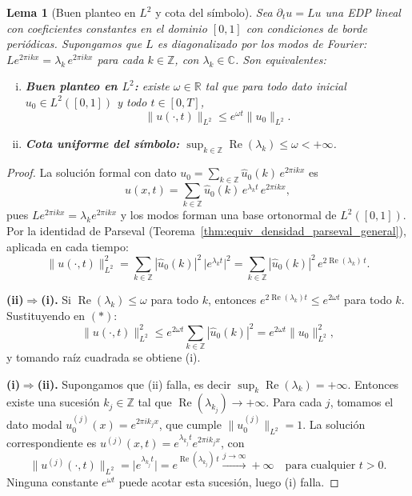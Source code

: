\documentclass[a4paper,11pt]{report}
\newtheorem{lemma}[theorem]{Lema}
\begin{document}
\begin{lemma}[Buen planteo en $L^2$ y cota del símbolo]\label{lem:buen_planteo_lambda}
Sea $\partial_t u = Lu$ una EDP lineal con coeficientes constantes en el dominio $[0,1]$ con condiciones de borde periódicas. Supongamos que $L$ es diagonalizado por los modos de Fourier: $L e^{2\pi ikx}=\lambda_k\,e^{2\pi ikx}$ para cada $k\in\mathbb{Z}$, con $\lambda_k\in\mathbb{C}$. Son equivalentes:
\begin{enumerate}[(i)]
  \item \textbf{Buen planteo en $L^2$:} existe $\omega\in\mathbb{R}$ tal que para todo dato inicial $u_0\in L^2([0,1])$ y todo $t\in[0,T]$,
    \[
      \|u(\cdot,t)\|_{L^2}\le e^{\omega t}\|u_0\|_{L^2}.
    \]
  \item \textbf{Cota uniforme del símbolo:} $\displaystyle\sup_{k\in\mathbb{Z}}\operatorname{Re}(\lambda_k)\le\omega<+\infty$.
\end{enumerate}
\end{lemma}

\begin{proof}
La solución formal con dato $u_0=\sum_{k\in\mathbb{Z}}\hat{u}_0(k)\,e^{2\pi ikx}$ es
\[
  u(x,t)=\sum_{k\in\mathbb{Z}}\hat{u}_0(k)\,e^{\lambda_k t}\,e^{2\pi ikx},
\]
pues $Le^{2\pi ikx}=\lambda_k e^{2\pi ikx}$ y los modos forman una base ortonormal de $L^2([0,1])$. Por la identidad de Parseval (Teorema~\ref{thm:equiv_densidad_parseval_general}), aplicada en cada tiempo:
\[
  \|u(\cdot,t)\|_{L^2}^2
  = \sum_{k\in\mathbb{Z}}|\hat{u}_0(k)|^2\,\bigl|e^{\lambda_k t}\bigr|^2
  = \sum_{k\in\mathbb{Z}}|\hat{u}_0(k)|^2\,e^{2\operatorname{Re}(\lambda_k)\,t}.\tag{$*$}
\]

\noindent\textbf{(ii)$\Rightarrow$(i).}  Si $\operatorname{Re}(\lambda_k)\le\omega$ para todo $k$, entonces $e^{2\operatorname{Re}(\lambda_k)t}\le e^{2\omega t}$ para todo $k$. Sustituyendo en $(*)$:
\[
  \|u(\cdot,t)\|_{L^2}^2
  \le e^{2\omega t}\sum_{k\in\mathbb{Z}}|\hat{u}_0(k)|^2
  = e^{2\omega t}\|u_0\|_{L^2}^2,
\]
y tomando raíz cuadrada se obtiene (i).

\noindent\textbf{(i)$\Rightarrow$(ii).}  Supongamos que (ii) falla, es decir $\sup_k\operatorname{Re}(\lambda_k)=+\infty$. Entonces existe una sucesión $k_j\in\mathbb{Z}$ tal que $\operatorname{Re}(\lambda_{k_j})\to+\infty$. Para cada $j$, tomamos el dato modal $u_0^{(j)}(x)=e^{2\pi ik_j x}$, que cumple $\|u_0^{(j)}\|_{L^2}=1$. La solución correspondiente es $u^{(j)}(x,t)=e^{\lambda_{k_j}t}e^{2\pi ik_jx}$, con
\[
  \bigl\|u^{(j)}(\cdot,t)\bigr\|_{L^2}
  = \bigl|e^{\lambda_{k_j}t}\bigr|
  = e^{\operatorname{Re}(\lambda_{k_j})\,t}
  \xrightarrow{j\to\infty}+\infty
  \quad\text{para cualquier }t>0.
\]
Ninguna constante $e^{\omega t}$ puede acotar esta sucesión, luego (i) falla.
\end{proof}
\end{document}
